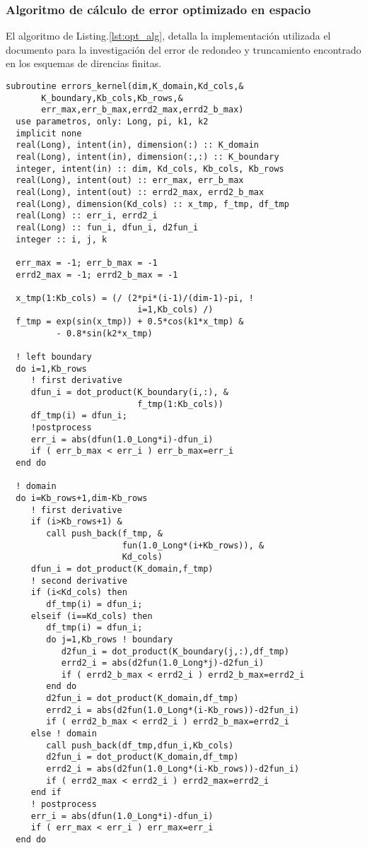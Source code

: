 \documentclass[9pt,technote,twoside,letterpaper,onecolumn]{IEEEtran}
\begin{document}
\subsubsection{Algoritmo de cálculo de error optimizado en espacio}
\label{sec:opt_alg}

El algoritmo de Listing.\ref{lst:opt_alg}, detalla la implementación utilizada el documento para la investigación del error de redondeo y truncamiento encontrado en los esquemas de direncias finitas.

\begin{multicols}{2}
\begin{lstlisting}[caption={Algoritmo del cálculo de las derivadas},label={lst:opt_alg}]
subroutine errors_kernel(dim,K_domain,Kd_cols,&
       K_boundary,Kb_cols,Kb_rows,&
       err_max,err_b_max,errd2_max,errd2_b_max)
  use parametros, only: Long, pi, k1, k2
  implicit none
  real(Long), intent(in), dimension(:) :: K_domain
  real(Long), intent(in), dimension(:,:) :: K_boundary
  integer, intent(in) :: dim, Kd_cols, Kb_cols, Kb_rows
  real(Long), intent(out) :: err_max, err_b_max
  real(Long), intent(out) :: errd2_max, errd2_b_max
  real(Long), dimension(Kd_cols) :: x_tmp, f_tmp, df_tmp
  real(Long) :: err_i, errd2_i 
  real(Long) :: fun_i, dfun_i, d2fun_i
  integer :: i, j, k

  err_max = -1; err_b_max = -1
  errd2_max = -1; errd2_b_max = -1

  x_tmp(1:Kb_cols) = (/ (2*pi*(i-1)/(dim-1)-pi, ! 
                          i=1,Kb_cols) /)
  f_tmp = exp(sin(x_tmp)) + 0.5*cos(k1*x_tmp) &
          - 0.8*sin(k2*x_tmp)

  ! left boundary
  do i=1,Kb_rows
     ! first derivative
     dfun_i = dot_product(K_boundary(i,:), &
                          f_tmp(1:Kb_cols))
     df_tmp(i) = dfun_i;
     !postprocess
     err_i = abs(dfun(1.0_Long*i)-dfun_i)
     if ( err_b_max < err_i ) err_b_max=err_i
  end do

  ! domain
  do i=Kb_rows+1,dim-Kb_rows
     ! first derivative
     if (i>Kb_rows+1) &
        call push_back(f_tmp, &
                       fun(1.0_Long*(i+Kb_rows)), &
                       Kd_cols)
     dfun_i = dot_product(K_domain,f_tmp)
     ! second derivative
     if (i<Kd_cols) then
        df_tmp(i) = dfun_i;
     elseif (i==Kd_cols) then
        df_tmp(i) = dfun_i;
        do j=1,Kb_rows ! boundary
           d2fun_i = dot_product(K_boundary(j,:),df_tmp)
           errd2_i = abs(d2fun(1.0_Long*j)-d2fun_i)
           if ( errd2_b_max < errd2_i ) errd2_b_max=errd2_i
        end do
        d2fun_i = dot_product(K_domain,df_tmp)
        errd2_i = abs(d2fun(1.0_Long*(i-Kb_rows))-d2fun_i)
        if ( errd2_b_max < errd2_i ) errd2_b_max=errd2_i
     else ! domain
        call push_back(df_tmp,dfun_i,Kb_cols)
        d2fun_i = dot_product(K_domain,df_tmp)
        errd2_i = abs(d2fun(1.0_Long*(i-Kb_rows))-d2fun_i)
        if ( errd2_max < errd2_i ) errd2_max=errd2_i
     end if
     ! postprocess
     err_i = abs(dfun(1.0_Long*i)-dfun_i)
     if ( err_max < err_i ) err_max=err_i
  end do


\end{lstlisting}
\end{multicols}
\end{document}
